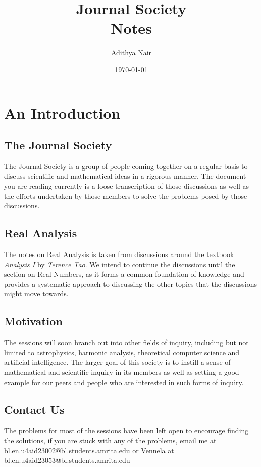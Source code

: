 \documentclass[11pt]{report}
\author{Adithya Nair}
\date{\today}
\title{\Huge{Journal Society\\ Notes}}
\begin{document}
\maketitle
\tableofcontents
\break

\chapter{An Introduction}
\section{The Journal Society}
The Journal Society is a group of people coming together on a regular basis to discuss scientific and mathematical ideas in a rigorous manner. The document you are reading currently is a loose transcription of those discussions as well as the efforts undertaken by those members to solve the problems posed by those discussions.

\section{Real Analysis}
The notes on Real Analysis is taken from discussions around the textbook \textit{Analysis I} by \textit{Terence Tao}. We intend to continue the discussions until the section on Real Numbers, as it forms a common foundation of knowledge and provides a systematic approach to discussing the other topics that the discussions might move towards.

\section{Motivation}
The sessions will soon branch out into other fields of inquiry, including but not limited to astrophysics, harmonic analysis, theoretical computer science and artificial intelligence. The larger goal of this society is to instill a sense of mathematical and scientific inquiry in its members as well as setting a good example for our peers and people who are interested in such forms of inquiry.

\section{Contact Us}
The problems for most of the sessions have been left open to encourage finding
the solutions, if you are stuck with any of the problems, email me at
bl.en.u4aid23002@bl.students.amrita.edu or Vennela at
bl.en.u4aid23053@bl.students.amrita.edu
\end{document}
